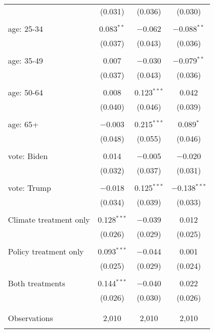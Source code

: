 \begin{tabular}{@{\extracolsep{5pt}}lccc}
  & (0.031) & (0.036) & (0.030) \\ 
  & & & \\ 
 age: 25-34 & 0.083$^{**}$ & $-$0.062 & $-$0.088$^{**}$ \\ 
  & (0.037) & (0.043) & (0.036) \\ 
  & & & \\ 
 age: 35-49 & 0.007 & $-$0.030 & $-$0.079$^{**}$ \\ 
  & (0.037) & (0.043) & (0.036) \\ 
  & & & \\ 
 age: 50-64 & 0.008 & 0.123$^{***}$ & 0.042 \\ 
  & (0.040) & (0.046) & (0.039) \\ 
  & & & \\ 
 age: 65+ & $-$0.003 & 0.215$^{***}$ & 0.089$^{*}$ \\ 
  & (0.048) & (0.055) & (0.046) \\ 
  & & & \\ 
 vote: Biden & 0.014 & $-$0.005 & $-$0.020 \\ 
  & (0.032) & (0.037) & (0.031) \\ 
  & & & \\ 
 vote: Trump & $-$0.018 & 0.125$^{***}$ & $-$0.138$^{***}$ \\ 
  & (0.034) & (0.039) & (0.033) \\ 
  & & & \\ 
 Climate treatment only & 0.128$^{***}$ & $-$0.039 & 0.012 \\ 
  & (0.026) & (0.029) & (0.025) \\ 
  & & & \\ 
 Policy treatment only & 0.093$^{***}$ & $-$0.044 & 0.001 \\ 
  & (0.025) & (0.029) & (0.024) \\ 
  & & & \\ 
 Both treatments & 0.144$^{***}$ & $-$0.040 & 0.022 \\ 
  & (0.026) & (0.030) & (0.026) \\ 
  & & & \\ 
\hline \\[-1.8ex] 

Observations & 2,010 & 2,010 & 2,010 \\ 
\hline 
\hline \\[-1.8ex] 
\end{tabular} 